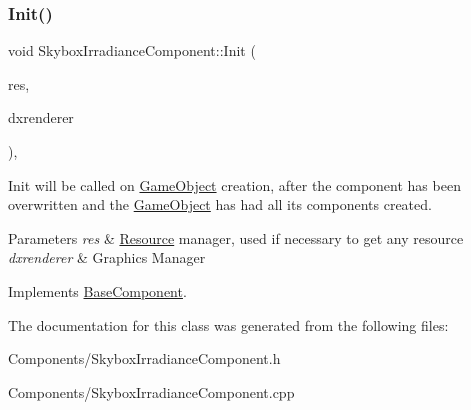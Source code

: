 \mbox{\label{classSkyboxIrradianceComponent_acb579a9a034d27a66da83960a973ea25}} 
\subsubsection{\texorpdfstring{Init()}{Init()}}
{\footnotesize\ttfamily void Skybox\+Irradiance\+Component\+::\+Init (\begin{DoxyParamCaption}\item[{\hyperlink{classResourceManager}{Resource\+Manager} $\ast$}]{res,  }\item[{\hyperlink{classDXRenderer}{D\+X\+Renderer} $\ast$}]{dxrenderer }\end{DoxyParamCaption})\hspace{0.3cm}{\ttfamily [override]}, {\ttfamily [virtual]}}



Init will be called on \hyperlink{classGameObject}{Game\+Object} creation, after the component has been overwritten and the \hyperlink{classGameObject}{Game\+Object} has had all its components created. 


\begin{DoxyParams}{Parameters}
{\em res} & \hyperlink{structResource}{Resource} manager, used if necessary to get any resource \\
\hline
{\em dxrenderer} & Graphic\textquotesingle{}s Manager \\
\hline
\end{DoxyParams}


Implements \hyperlink{classBaseComponent}{Base\+Component}.



The documentation for this class was generated from the following files\+:\begin{DoxyCompactItemize}
\item 
Components/Skybox\+Irradiance\+Component.\+h\item 
Components/Skybox\+Irradiance\+Component.\+cpp\end{DoxyCompactItemize}
